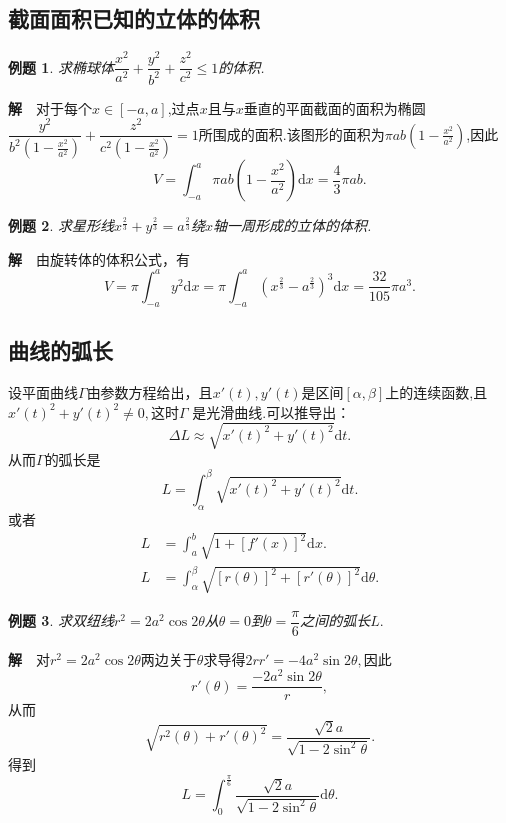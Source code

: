 \documentclass[UTF8]{article}
\newcommand{\dx}{\mathrm{d}x}
\newcommand{\jie}{\textbf{解}$\quad$}
\newtheorem{exa}{\hspace{2em}例题}[section]
\begin{document}
\subsection{截面面积已知的立体的体积}
\begin{exa}
  求椭球体$\dfrac{x^2}{a^2}+\dfrac{y^2}{b^2}+\dfrac{z^2}{c^2}\le 1$的体积.
\end{exa}
\jie 对于每个$x\in[-a,a]$,过点$x$且与$x$垂直的平面截面的面积为椭圆$\dfrac{y^2}{b^2(1-\frac{x^2}{a^2})}+
\dfrac{z^2}{c^2(1-\frac{x^2}{a^2})}=1$所围成的面积.该图形的面积为$\pi ab(1-\frac{x^2}{a^2})$,因此
$$V=\int_{-a}^a\pi ab(1-\frac{x^2}{a^2})\dx=\frac{4}{3}\pi ab.$$
\begin{exa}
  求星形线$x^\frac{2}{3}+y^\frac{2}{3}=a^\frac{2}{3}$绕$x$轴一周形成的立体的体积.
\end{exa}
\jie 由旋转体的体积公式，有
$$V=\pi\int_{-a}^ay^2\dx=\pi\int_{-a}^a(x^\frac{2}{3}-a^\frac{2}{3})^3\dx=\frac{32}{105}\pi a^3.$$
\subsection{曲线的弧长}
  设平面曲线$\Gamma$由参数方程给出，且$x'(t),y'(t)$是区间$[\alpha,\beta]$上的连续函数,且$x'(t)^2+y'(t)^2\ne0,$这时$\Gamma$
  是光滑曲线.可以推导出：
  $$\Delta L\approx\sqrt{x'(t)^2+y'(t)^2}\mathrm{d}t.$$从而$\Gamma$的弧长是
  $$L=\int_\alpha^\beta\sqrt{x'(t)^2+y'(t)^2}\mathrm{d}t.$$
  或者
  \begin{align*}
    L&=\int_a^b\sqrt{1+[f'(x)]^2}\dx.\\
    L&=\int_\alpha^\beta\sqrt{[r(\theta)]^2+[r'(\theta)]^2}\mathrm{d}\theta.
  \end{align*}
\begin{exa}
  求双纽线$r^2=2a^2\cos2\theta$从$\theta=0$到$\theta=\dfrac{\pi}{6}$之间的弧长$L.$
\end{exa}
\jie 对$r^2=2a^2\cos2\theta$两边关于$\theta$求导得$2rr'=-4a^2\sin2\theta,$因此
$$r'(\theta)=\frac{-2a^2\sin2\theta}{r},$$从而
$$\sqrt{r^2(\theta)+r'(\theta)^2}=\frac{\sqrt{2}a}{\sqrt{1-2\sin^2\theta}}.$$得到
$$L=\int_0^\frac{\pi}{6}\frac{\sqrt{2}a}{\sqrt{1-2\sin^2\theta}}\mathrm{d}\theta.$$
\clearpage
\end{document}
